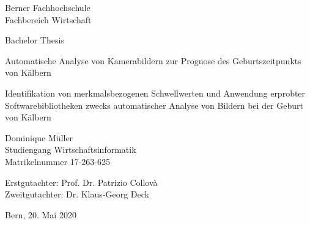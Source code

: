 
\begin{titlepage}
	
	\begin{center}

		\small{Berner Fachhochschule\\
			Fachbereich Wirtschaft\\}
		
		\vspace{0.75cm}
		\large{\textrm{Bachelor Thesis }}
		\vspace{0.75cm}
		
		\Huge{Automatische Analyse von Kamerabildern zur Prognose des Geburtszeitpunkts von Kälbern\\}
		
		\vspace{1cm}
		\LARGE{Identifikation von merkmalsbezogenen Schwellwerten und  Anwendung erprobter Softwarebibliotheken zwecks automatischer Analyse von Bildern bei der Geburt von Kälbern   \\
		\vspace{1.75cm}	
			
			
			\LARGE{Dominique Müller}\\
			\vspace{1cm}
			\large{Studiengang Wirtschaftsinformatik\\
				Matrikelnummer 17-263-625}
			
			\vspace{1cm}
			\large Erstgutachter: Prof. Dr. Patrizio Collovà\\
			\large Zweitgutachter: Dr. Klaus-Georg Deck\\}
			\vspace{1cm}
			
			\large{Bern, 20. Mai 2020} \\

		
		
	\end{center}
	
\end{titlepage}

